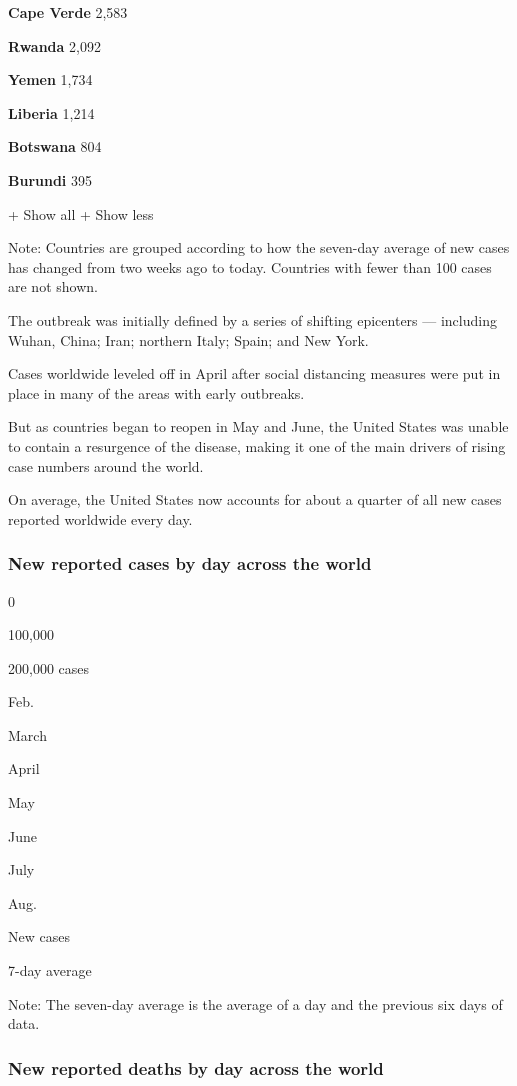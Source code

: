 \textbf{Cape Verde} 2,583

\textbf{Rwanda} 2,092

\textbf{Yemen} 1,734

\textbf{Liberia} 1,214

\textbf{Botswana} 804

\textbf{Burundi} 395

+ Show all + Show less

Note: Countries are grouped according to how the seven-day average of
new cases has changed from two weeks ago to today. Countries with fewer
than 100 cases are not shown.

The outbreak was initially defined by a series of shifting epicenters
--- including Wuhan, China; Iran; northern Italy; Spain; and New York.

Cases worldwide leveled off in April after social distancing measures
were put in place in many of the areas with early outbreaks.

But as countries began to reopen in May and June, the United States was
unable to contain a resurgence of the disease, making it one of the main
drivers of rising case numbers around the world.

On average, the United States now accounts for about a quarter of all
new cases reported worldwide every day.

\hypertarget{new-reported-cases-by-day-across-the-world}{%
\subsubsection{New reported cases by day across the
world}\label{new-reported-cases-by-day-across-the-world}}

0

100,000

200,000 cases

Feb.

March

April

May

June

July

Aug.

New cases

7-day average

Note: The seven-day average is the average of a day and the previous six
days of data.

\hypertarget{new-reported-deaths-by-day-across-the-world}{%
\subsubsection{New reported deaths by day across the
world}\label{new-reported-deaths-by-day-across-the-world}}

